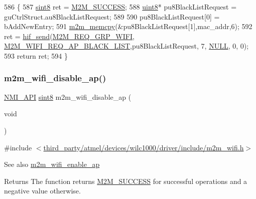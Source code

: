 \begin{DoxyCode}
586 \{
587     \hyperlink{group__DataT_gae35f10ffd0ac8dd2bc3e794da9bdfbc7}{sint8} ret = \hyperlink{nm__common_8h_a9ef27ba27aafdd1aa3a79d3ba2c36b8f}{M2M\_SUCCESS};
588     \hyperlink{group__DataT_ga4df709a77647e870bbf1d955b8edc9a6}{uint8}* pu8BlackListRequest = guCtrlStruct.au8BlackListRequest;
589 
590     pu8BlackListRequest[0] = bAddNewEntry;
591     \hyperlink{nm__common_8h_a62b30b611dfcc58e190254d1f663470a}{m2m\_memcpy}(&pu8BlackListRequest[1],mac\_addr,6);
592     ret = \hyperlink{m2m__hif_8c_a13ba8ad11b2ac39516ca787386d16ce0}{hif\_send}(\hyperlink{nm__common_8h_a9ab02eb1aea02a75c3f5aade4eef1276aeb9a7d57324ba4b8a6c2a5f46dd499c2}{M2M\_REQ\_GRP\_WIFI}, 
      \hyperlink{group__WlanEnums_ggaa62989ea5e2977b374a04db81c89d524adb0a42de9451d51642d7269fea6fce9a}{M2M\_WIFI\_REQ\_AP\_BLACK\_LIST},pu8BlackListRequest, 7, 
      \hyperlink{group__BSPDefine_ga070d2ce7b6bb7e5c05602aa8c308d0c4}{NULL}, 0, 0);
593     \textcolor{keywordflow}{return} ret;
594 \}
\end{DoxyCode}
\mbox{\label{group__WifiDisableApFn_ga69d3d1d687a493fa31c05109cfe3d05a}} 
\subsubsection{\texorpdfstring{m2m\+\_\+wifi\+\_\+disable\+\_\+ap()}{m2m\_wifi\_disable\_ap()}}
{\footnotesize\ttfamily \hyperlink{group__BSPDefine_gaecc0323d771e41ef81a76b5f12783e22}{N\+M\+I\+\_\+\+A\+PI} \hyperlink{group__DataT_gae35f10ffd0ac8dd2bc3e794da9bdfbc7}{sint8} m2m\+\_\+wifi\+\_\+disable\+\_\+ap (\begin{DoxyParamCaption}\item[{void}]{ }\end{DoxyParamCaption})}



{\ttfamily \#include $<$\hyperlink{m2m__wifi_8h}{third\+\_\+party/atmel/devices/wilc1000/driver/include/m2m\+\_\+wifi.\+h}$>$}

\begin{DoxySeeAlso}{See also}
\hyperlink{group__WifiEnableApFn_gab34cff419964df3c4e1ed86076aef7ce}{m2m\+\_\+wifi\+\_\+enable\+\_\+ap} 
\end{DoxySeeAlso}
\begin{DoxyReturn}{Returns}
The function returns \hyperlink{nm__common_8h_a9ef27ba27aafdd1aa3a79d3ba2c36b8f}{M2\+M\+\_\+\+S\+U\+C\+C\+E\+SS} for successful operations and a negative value otherwise. 
\end{DoxyReturn}


